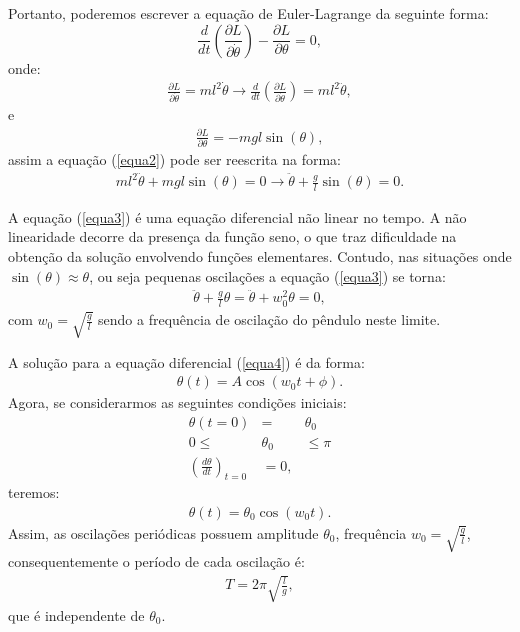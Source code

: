 \documentclass[12pt,openright,twoside,english,brazil]{abntex2}
\begin{document}
Portanto, poderemos escrever a equação de Euler-Lagrange da seguinte forma:
\begin{equation}
 \frac{d}{dt} \left( \frac{\partial L}{\partial \dot{\theta}} \right) - \frac{\partial L}{\partial \theta} = 0,
 \label{equa2}
\end{equation}
onde:
\begin{eqnarray}
 \frac{\partial L}{\partial \dot{\theta}} = ml^2 \dot{\theta} \rightarrow \frac{d}{dt} \left( \frac{\partial L}{\partial \dot{\theta}} \right) = ml^2 \ddot{\theta}, \nonumber
\end{eqnarray}
e
\begin{eqnarray}
 \frac{\partial L}{\partial \theta} = -mgl\sin{(\theta)}, \nonumber
\end{eqnarray}
assim a equação (\ref{equa2}) pode ser reescrita na forma:
\begin{eqnarray}
 ml^2 \ddot{\theta} + mgl \sin{(\theta)} = 0 \rightarrow \ddot{\theta} + \frac{g}{l} \sin{(\theta)} = 0.
 \label{equa3}
\end{eqnarray}

A equação (\ref{equa3}) é uma equação diferencial não linear no tempo. A não linearidade decorre da presença da função seno, o que traz dificuldade na obtenção da solução envolvendo funções elementares. Contudo, nas situações onde $\sin{(\theta)} \approx \theta$, ou seja pequenas oscilações a equação (\ref{equa3}) se torna:
\begin{eqnarray}
 \ddot{\theta} + \frac{g}{l} \theta = \ddot{\theta} + w_0^2 \theta = 0,
 \label{equa4}
\end{eqnarray}
com $w_0=\sqrt{\frac{g}{l}}$ sendo a frequência de oscilação do pêndulo neste limite.

A solução para a equação diferencial (\ref{equa4}) é da forma:
\begin{eqnarray}
 \theta (t) =  A \cos{(w_0t+\phi)}.
 \label{equa5}
\end{eqnarray}
Agora, se considerarmos as seguintes condições iniciais:
\begin{eqnarray}
 \theta(t=0) & = & \theta_0 \nonumber \\
 0 \leq & \theta_0 & \leq \pi \\
 \left( \frac{d \theta}{dt} \right)_{t=0} & = 0, \nonumber
 \label{equa6}
\end{eqnarray}
teremos:
\begin{eqnarray}
 \theta(t) = \theta_0 \cos{(w_0t)}.
 \label{equa7}
\end{eqnarray}
Assim, as oscilações periódicas possuem amplitude $\theta_0$, frequência $w_0=\sqrt{\frac{g}{l}}$, consequentemente o período de cada oscilação é:
\begin{eqnarray}
 T = 2\pi \sqrt{\frac{l}{g}},
 \label{equa8}
\end{eqnarray}
que é independente de $\theta_0$.
\end{document}
